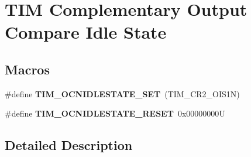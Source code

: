 \hypertarget{group___t_i_m___output___compare___n___idle___state}{}\section{T\+IM Complementary Output Compare Idle State}
\label{group___t_i_m___output___compare___n___idle___state}
\subsection*{Macros}
\begin{DoxyCompactItemize}
\item 
\mbox{\label{group___t_i_m___output___compare___n___idle___state_ga1f781774c71822b2502633dfc849c5ea}} 
\#define {\bfseries T\+I\+M\+\_\+\+O\+C\+N\+I\+D\+L\+E\+S\+T\+A\+T\+E\+\_\+\+S\+ET}~(T\+I\+M\+\_\+\+C\+R2\+\_\+\+O\+I\+S1N)
\item 
\mbox{\label{group___t_i_m___output___compare___n___idle___state_ga7586655652e3c3f1cb4af1ed59d25901}} 
\#define {\bfseries T\+I\+M\+\_\+\+O\+C\+N\+I\+D\+L\+E\+S\+T\+A\+T\+E\+\_\+\+R\+E\+S\+ET}~0x00000000U
\end{DoxyCompactItemize}


\subsection{Detailed Description}
